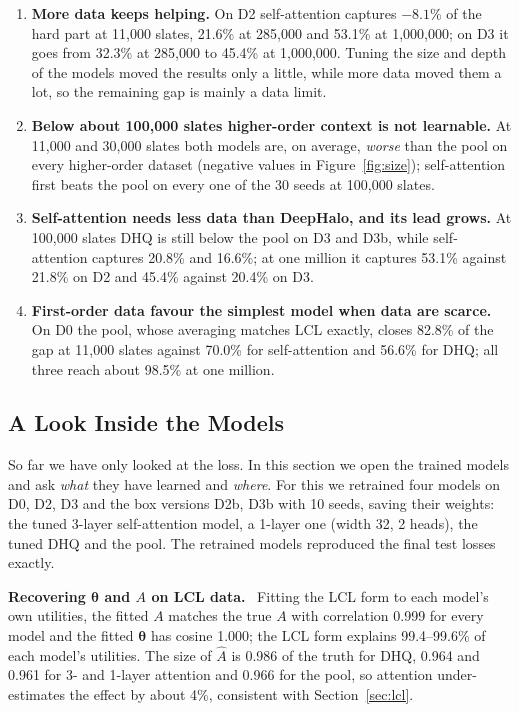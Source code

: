 \documentclass[11pt,a4paper]{article}
\numberwithin{table}{section}
\numberwithin{figure}{section}
\numberwithin{equation}{section}
\newcommand{\para}[1]{\textbf{#1}\ }
\begin{document}
\begin{enumerate}
\item \textbf{More data keeps helping.} On D2 self-attention captures $-8.1\%$ of the hard part at 11,000 slates, 21.6\% at 285,000 and 53.1\% at 1,000,000; on D3 it goes from 32.3\% at 285,000 to 45.4\% at 1,000,000. Tuning the size and depth of the models moved the results only a little, while more data moved them a lot, so the remaining gap is mainly a data limit.
\item \textbf{Below about 100,000 slates higher-order context is not learnable.} At 11,000 and 30,000 slates both models are, on average, \emph{worse} than the pool on every higher-order dataset (negative values in Figure~\ref{fig:size}); self-attention first beats the pool on every one of the 30 seeds at 100,000 slates.
\item \textbf{Self-attention needs less data than DeepHalo, and its lead grows.} At 100,000 slates DHQ is still below the pool on D3 and D3b, while self-attention captures 20.8\% and 16.6\%; at one million it captures 53.1\% against 21.8\% on D2 and 45.4\% against 20.4\% on D3.
\item \textbf{First-order data favour the simplest model when data are scarce.} On D0 the pool, whose averaging matches LCL exactly, closes 82.8\% of the gap at 11,000 slates against 70.0\% for self-attention and 56.6\% for DHQ; all three reach about 98.5\% at one million.
\end{enumerate}

\subsection{A Look Inside the Models}\label{sec:inside}
So far we have only looked at the loss. In this section we open the trained models and ask \emph{what} they have learned and \emph{where}. For this we retrained four models on D0, D2, D3 and the box versions D2b, D3b with 10 seeds, saving their weights: the tuned 3-layer self-attention model, a 1-layer one (width 32, 2 heads), the tuned DHQ and the pool. The retrained models reproduced the final test losses exactly.

\para{Recovering $\bm\theta$ and $A$ on LCL data.} Fitting the LCL form to each model's own utilities, the fitted $A$ matches the true $A$ with correlation 0.999 for every model and the fitted $\bm\theta$ has cosine 1.000; the LCL form explains 99.4--99.6\% of each model's utilities. The size of $\hat A$ is 0.986 of the truth for DHQ, 0.964 and 0.961 for 3- and 1-layer attention and 0.966 for the pool, so attention under-estimates the effect by about 4\%, consistent with Section~\ref{sec:lcl}.
\end{document}
